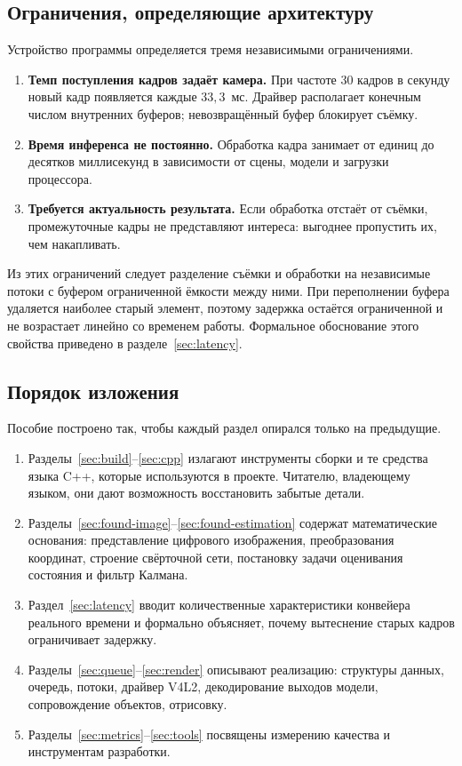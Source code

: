 \documentclass[11pt,a4paper]{article}
\theoremstyle{definition}
\theoremstyle{remark}
\begin{document}
\subsection{Ограничения, определяющие архитектуру}

Устройство программы определяется тремя независимыми ограничениями.

\begin{enumerate}
  \item \textbf{Темп поступления кадров задаёт камера.} При частоте 30 кадров
        в секунду новый кадр появляется каждые $33{,}3$~мс. Драйвер
        располагает конечным числом внутренних буферов; невозвращённый буфер
        блокирует съёмку.
  \item \textbf{Время инференса не постоянно.} Обработка кадра занимает от
        единиц до десятков миллисекунд в зависимости от сцены, модели и
        загрузки процессора.
  \item \textbf{Требуется актуальность результата.} Если обработка отстаёт от
        съёмки, промежуточные кадры не представляют интереса: выгоднее
        пропустить их, чем накапливать.
\end{enumerate}

Из этих ограничений следует разделение съёмки и обработки на независимые
потоки с буфером ограниченной ёмкости между ними. При переполнении буфера
удаляется наиболее старый элемент, поэтому задержка остаётся ограниченной и
не возрастает линейно со временем работы. Формальное обоснование этого
свойства приведено в разделе~\ref{sec:latency}.

\subsection{Порядок изложения}

Пособие построено так, чтобы каждый раздел опирался только на предыдущие.

\begin{enumerate}
  \item Разделы~\ref{sec:build}--\ref{sec:cpp} излагают инструменты сборки и
        те средства языка C++, которые используются в проекте. Читателю,
        владеющему языком, они дают возможность восстановить забытые детали.
  \item Разделы~\ref{sec:found-image}--\ref{sec:found-estimation} содержат
        математические основания: представление цифрового изображения,
        преобразования координат, строение свёрточной сети, постановку задачи
        оценивания состояния и фильтр Калмана.
  \item Раздел~\ref{sec:latency} вводит количественные характеристики
        конвейера реального времени и формально объясняет, почему вытеснение
        старых кадров ограничивает задержку.
  \item Разделы~\ref{sec:queue}--\ref{sec:render} описывают реализацию:
        структуры данных, очередь, потоки, драйвер V4L2, декодирование
        выходов модели, сопровождение объектов, отрисовку.
  \item Разделы~\ref{sec:metrics}--\ref{sec:tools} посвящены измерению
        качества и инструментам разработки.
\end{enumerate}
\end{document}
